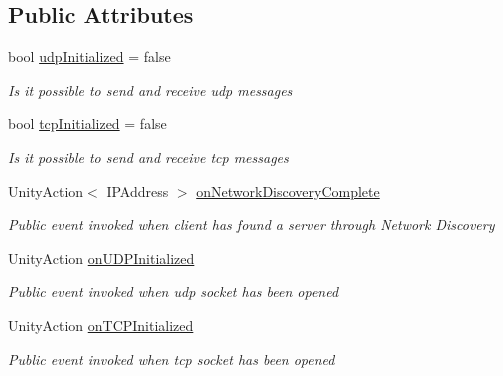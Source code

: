 \subsection*{Public Attributes}
\begin{DoxyCompactItemize}
\item 
bool \mbox{\hyperlink{class_enhanced_dodo_server_1_1_client_a2802635f891a50ae73cfb1e16c2c8717}{udp\+Initialized}} = false
\begin{DoxyCompactList}\small\item\em Is it possible to send and receive udp messages \end{DoxyCompactList}\item 
bool \mbox{\hyperlink{class_enhanced_dodo_server_1_1_client_a34b0d7b1f3f0e9dcda5bcbbe82099748}{tcp\+Initialized}} = false
\begin{DoxyCompactList}\small\item\em Is it possible to send and receive tcp messages \end{DoxyCompactList}\item 
Unity\+Action$<$ I\+P\+Address $>$ \mbox{\hyperlink{class_enhanced_dodo_server_1_1_client_af61babd96563a6e7ac98d33b77b881a8}{on\+Network\+Discovery\+Complete}}
\begin{DoxyCompactList}\small\item\em Public event invoked when client has found a server through Network Discovery \end{DoxyCompactList}\item 
Unity\+Action \mbox{\hyperlink{class_enhanced_dodo_server_1_1_client_aa47b86ba686fead3a2e0448753735bd9}{on\+U\+D\+P\+Initialized}}
\begin{DoxyCompactList}\small\item\em Public event invoked when udp socket has been opened \end{DoxyCompactList}\item 
Unity\+Action \mbox{\hyperlink{class_enhanced_dodo_server_1_1_client_a0b727241a8ab4265dd0e9165877de5ee}{on\+T\+C\+P\+Initialized}}
\begin{DoxyCompactList}\small\item\em Public event invoked when tcp socket has been opened \end{DoxyCompactList}\end{DoxyCompactItemize}
